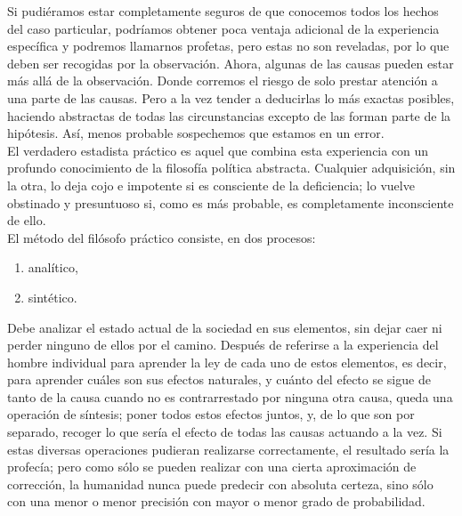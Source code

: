 Si pudiéramos estar completamente seguros de que conocemos todos los hechos del caso particular, podríamos obtener poca ventaja adicional de la experiencia específica y podremos llamarnos profetas, pero estas no son reveladas, por lo que deben ser recogidas por la observación. Ahora, algunas de las causas pueden estar más allá de la observación. Donde corremos el riesgo de solo prestar atención a una parte de las causas. Pero a la vez tender a deducirlas lo más exactas posibles, haciendo abstractas de todas las circunstancias excepto de las forman parte de la hipótesis. Así, menos probable sospechemos que estamos en un error.\\

El verdadero estadista práctico es aquel que combina esta experiencia con un profundo conocimiento de la filosofía política abstracta. Cualquier adquisición, sin la otra, lo deja cojo e impotente si es consciente de la deficiencia; lo vuelve obstinado y presuntuoso si, como es más probable, es completamente inconsciente de ello.\\

El método del filósofo práctico consiste, en dos procesos:

\begin{enumerate}[1.]
    \item analítico,
    \item sintético.
\end{enumerate}

Debe analizar el estado actual de la sociedad en sus elementos, sin dejar caer ni perder ninguno de ellos por el camino. Después de referirse a la experiencia del hombre individual para aprender la ley de cada uno de estos elementos, es decir, para aprender cuáles son sus efectos naturales, y cuánto del efecto se sigue de tanto de la causa cuando no es contrarrestado por ninguna otra causa, queda una operación de síntesis; poner todos estos efectos juntos, y, de lo que son por separado, recoger lo que sería el efecto de todas las causas actuando a la vez. Si estas diversas operaciones pudieran realizarse correctamente, el resultado sería la profecía; pero como sólo se pueden realizar con una cierta aproximación de corrección, la humanidad nunca puede predecir con absoluta certeza, sino sólo con una menor o menor precisión con mayor o menor grado de probabilidad. \\

